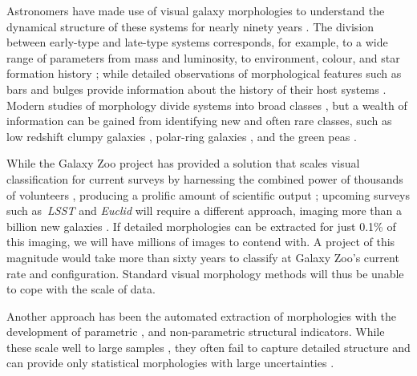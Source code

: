 \documentclass[twocolumn,  trackchanges, ]{aastex6}%
\begin{document}
Astronomers have made use of visual galaxy morphologies to understand the dynamical structure of these systems for nearly ninety years 
\citep[e.g.,][]{Hubble1936, 
			deVauc1959, 
			Sandage1961, 
			vandenBergh1976, 
			NairAbraham2010, 
			Baillard2011}. 
The division between early-type and late-type systems corresponds, for example, to a wide range of parameters from mass and luminosity, to environment, colour, and star formation history 
\citep[e.g.,][]{Kormendy1977,  
			Dressler1980, 
			Strateva2001, 
			Blanton2003, 
			Kauffman2003, 
			Nakamura2003, 
			Shen2003, 
			Peng2010}; 
while detailed observations of morphological features such as bars and bulges 
provide information about the history of their host systems 
\citep[e.g., reviews by][]{KK04, 
			Elmegreen2008, 
			Sheth2008, 
			Masters2010, 
			Simmons2014}. 
Modern studies of morphology  divide systems into broad classes 
\citep[e.g.,][]{Conselice2006, 
			Lintott2008, 
			Kartaltepe2015, 
			Peth2016}, 
but a wealth of information can be gained from identifying new and often rare classes, 
such as low redshift clumpy galaxies \citep[e.g.,][]{Elmegreen2013}, polar-ring galaxies \citep[e.g.,][]{Whitmore1990}, and the green peas \citep{Cardamone2009}. 


While the Galaxy Zoo project has provided a solution that scales visual classification for current surveys  by harnessing the combined power of thousands of volunteers \citep{Lintott2008, Lintott2011, Willett2013, Willett2017, Simmons2017}, producing a prolific amount of scientific output \citep[e.g.,][]{Land2008, Bamford2009, Darg2010, Schawinski2014, Galloway2015, Smethurst2016}; upcoming surveys such as~\textit{LSST} and \textit{Euclid} will require a different approach, imaging more than a billion new galaxies  \citep{LSST, Euclid}.  If detailed morphologies can be extracted for just 0.1\% of this imaging, we will have millions of images to contend with. A project of this magnitude would take more than sixty years to classify at Galaxy Zoo's current rate and configuration. Standard visual morphology methods will thus be unable to cope with the scale of data. 

Another approach has been the automated extraction of morphologies with the development of parametric \citep{Sersic1968, Odewahn2002, Peng2002}, and non-parametric \citep{Abraham1994, Conselice2003, Abraham2003, Lotz2004,
 Freeman2013} structural indicators. While these scale well to large samples 
\citep[e.g.,][]{Simard2011, 
			Griffith2012, 
			Casteels2014, 
			Holwerda2014, 
			Meert2016}, 
they often fail to capture detailed structure and can provide only statistical morphologies with large uncertainties \cite[e.g.,][]{Abraham1996, Bershady2000}. 
\end{document}
